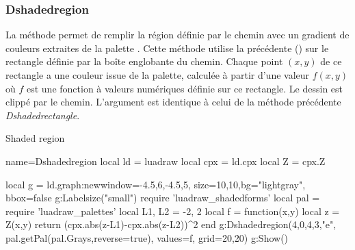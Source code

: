 \subsubsection{Dshadedregion}

La méthode  permet de remplir la région définie par le chemin  avec un gradient de couleurs extraites de la palette . Cette méthode utilise la précédente () sur le rectangle définie par la boîte englobante du chemin. Chaque point $(x,y)$ de ce rectangle a une couleur issue de la palette, calculée à partir d'une valeur $f(x,y)$ où $f$ est une fonction à valeurs numériques définie sur ce rectangle. Le dessin est clippé par le chemin. L'argument  est identique à celui de la méthode précédente \emph{Dshadedrectangle}.

\begin{demo}{Shaded region}
\begin{luadraw}{name=Dshadedregion}
local ld = luadraw
local cpx = ld.cpx
local Z = cpx.Z

local g = ld.graph:new{window={-4.5,6,-4.5,5}, size={10,10},bg="lightgray", bbox=false}
g:Labelsize("small")
require 'luadraw_shadedforms'
local pal = require 'luadraw_palettes'
local L1, L2 = -2, 2
local f = function(x,y) 
    local z = Z(x,y)
    return (cpx.abs(z-L1)-cpx.abs(z-L2))^2
end
g:Dshadedregion({4,0,4,3,"e"}, pal.getPal(pal.Grays,{reverse=true}), {values=f, grid={20,20}})
g:Show()
\end{luadraw}
\end{demo}
